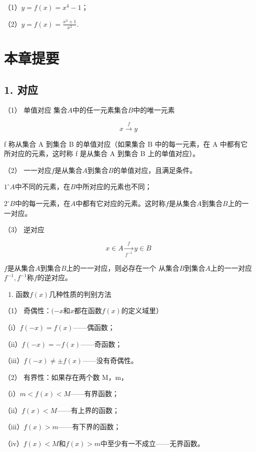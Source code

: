 （1）\(y=f(x)=x^4-1\)；

（2）\(y = f(x) = \frac{x^2 + 1}{x^2}.\)

\section{本章提要}

\subsection{1. 对应}

（1） 单值对应 集合\(A\)中的任一元素集合\(B\)中的唯一元素

\[
x \xrightarrow {f} y
\]

f 称从集合 A 到集合 B 的单值对应（如果集合 B 中的每一元素，在 A
中都有它所对应的元素，这时称 f 是从集合 A 到集合 B 上的单值对应）。

（2） 一一对应\(f\)是从集合\(A\)到集合\(B\)的单值对应，且满足条件。

\(1^{\circ} A\)中不同的元素，在\(B\)中所对应的元素也不同；

\(2^{\circ} B\)中的每一元素，在\(A\)中都有它对应的元素。这时称\(f\)是从集合\(A\)到集合\(B\)上的一一对应。

（3） 逆对应

\[
x \in A \xrightarrow [ f^{- 1} ]{f} y \in B
\]

\(f\)是从集合\(A\)到集合\(B\)上的一一对应，则必存在一个
从集合\(B\)到集合\(A\)上的一一对应\(f^{-1}, f^{-1}\)称\(f\)的逆对应。

\begin{enumerate}[start=2]
\item
  函数\(f(x)\)几种性质的判别方法
\end{enumerate}

（1） 奇偶性：\((-x\)和\(x\)都在函数\(f(x)\)的定义域里）

（i）\(f(-x) = f(x)\)------偶函数；

（ii）\(f(-x) = -f(x)\)------奇函数；

（iii）\(f(-x) \neq \pm f(x)\)------没有奇偶性。

（2） 有界性：如果存在两个数 M，m，

（i）\(m < f(x) < M\)------有界函数；

（ii）\(f(x) < M\)------有上界的函数；

（iii）\(f(x) > m\)------有下界的函数；

（iv）\(f(x) < M\)和\(f(x) > m\)中至少有一不成立------无界函数。


